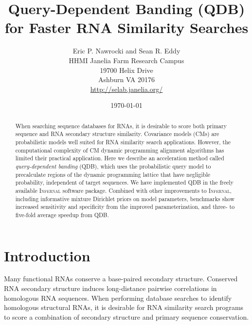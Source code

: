 \documentclass[11pt]{article}
\begin{document}
\title{Query-Dependent Banding (QDB) for Faster RNA Similarity Searches}
\author{Eric P. Nawrocki and Sean R. Eddy\\
HHMI Janelia Farm Research Campus\\
19700 Helix Drive\\
Ashburn VA 20176\\
\url{http://selab.janelia.org/}\\
}
\date{\today}
\maketitle




\begin{abstract}

When searching sequence databases for RNAs, it is desirable to score
both primary sequence and RNA secondary structure similarity.
Covariance models (CMs) are probabilistic models well suited for RNA
similarity search applications. However, the computational complexity
of CM dynamic programming alignment algorithms has limited their
practical application. Here we describe an acceleration method called
\emph{query-dependent banding} (QDB), which uses the probabilistic
query model to precalculate regions of the dynamic programming lattice
that have negligible probability, independent of target sequences. We
have implemented QDB in the freely available \textsc{Infernal}
software package. Combined with other improvements to
\textsc{Infernal}, including informative mixture Dirichlet priors on
model parameters, benchmarks show increased sensitivity and
specificity from the improved parameterization, and three- to
five-fold average speedup from QDB.

\end{abstract}



\section{Introduction}

Many functional RNAs conserve a base-paired secondary structure.
Conserved RNA secondary structure induces long-distance pairwise
correlations in homologous RNA sequences.  When performing database
searches to identify homologous structural RNAs, it is desirable for
RNA similarity search programs to score a combination of secondary
structure and primary sequence conservation.
\end{document}
